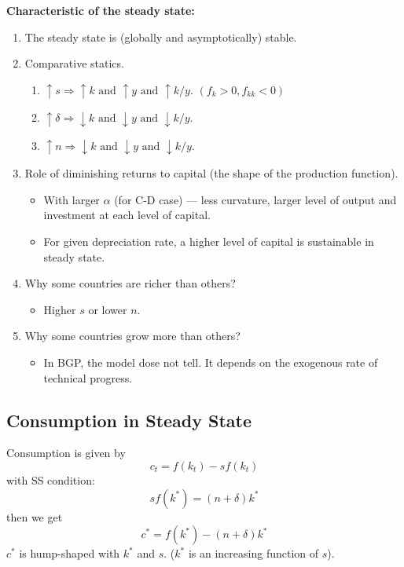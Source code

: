 \textbf{Characteristic of the steady state:} \begin{enumerate}
    \item The steady state is (globally and asymptotically) stable.
    \item Comparative statics. \begin{enumerate}
              \item $\uparrow s \Rightarrow \uparrow k \text{ and } \uparrow y \text{ and } \uparrow k/y$. $(f_k > 0, f_{kk} < 0)$
              \item $\uparrow \delta \Rightarrow \downarrow k \text{ and } \downarrow y \text{ and } \downarrow k/y$.
              \item $\uparrow n \Rightarrow \downarrow k \text{ and } \downarrow y \text{ and } \downarrow k/y$.
          \end{enumerate}
    \item Role of diminishing returns to capital (the shape of the production function). \begin{itemize}
              \item With larger $\alpha$ (for C-D case) --- less curvature, larger level of output and investment at each level of capital.
              \item For given depreciation rate, a higher level of capital is sustainable in steady state.
          \end{itemize}
    \item Why some countries are richer than others? \begin{itemize}
              \item Higher $s$ or lower $n$.
          \end{itemize}
    \item Why some countries grow more than others? \begin{itemize}
              \item In BGP, the model dose not tell. It depends on the exogenous rate of technical progress.
          \end{itemize}
\end{enumerate}

\subsection{Consumption in Steady State} Consumption is given by
\[
    c_t  = f(k_t) - s f(k_t)
\]with SS condition: \[
    sf(k^*)    =(n+\delta)k^*
\] then we get \[
    c^* = f(k^*) - (n+\delta)k^*
\]
$c^*$ is hump-shaped with $k^*$ and $s$. ($k^*$ is an increasing function of $s$).

